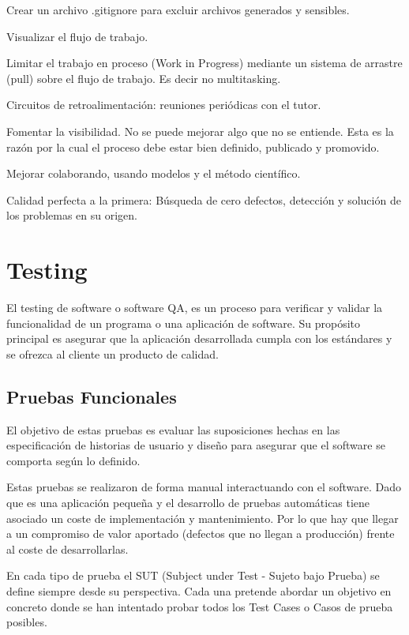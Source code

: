 \documentclass[12pt,twoside,titlepage]{report}
\begin{document}
\begin{compactitem}
    \item Crear un archivo .gitignore para excluir archivos generados y sensibles.
    \item Visualizar el flujo de trabajo.
    \item Limitar el trabajo en proceso (Work in Progress) mediante un sistema de arrastre (pull) sobre el flujo de trabajo. Es decir no multitasking.
    \item Circuitos de retroalimentación: reuniones periódicas con el tutor.
    \item Fomentar la visibilidad. No se puede mejorar algo que no se entiende. Esta es la razón por la cual el proceso debe estar bien definido, publicado y promovido.
    \item Mejorar colaborando, usando modelos y el método científico.
    \item Calidad perfecta a la primera: Búsqueda de cero defectos, detección y solución de los problemas en su origen.
\end{compactitem}

\section{Testing}

El testing de software o software QA, es un proceso para verificar y validar la funcionalidad de un programa o una aplicación de software. Su propósito principal es asegurar que la aplicación desarrollada cumpla con los estándares y se ofrezca al cliente un producto de calidad.

\subsection{Pruebas Funcionales}

El objetivo de estas pruebas es evaluar las suposiciones hechas en las especificación de historias de usuario y diseño para asegurar que el software se comporta según lo definido.

Estas pruebas se realizaron de forma manual interactuando con el software. Dado que es una aplicación pequeña y el desarrollo de pruebas automáticas tiene asociado un coste de implementación y mantenimiento. Por lo que hay que llegar a un compromiso de valor aportado (defectos que no llegan a producción) frente al coste de desarrollarlas. 

En cada tipo de prueba el SUT (Subject under Test - Sujeto bajo Prueba) se define siempre desde su perspectiva. Cada una pretende abordar un objetivo en concreto donde se han intentado probar todos los Test Cases o Casos de prueba posibles.
\end{document}
